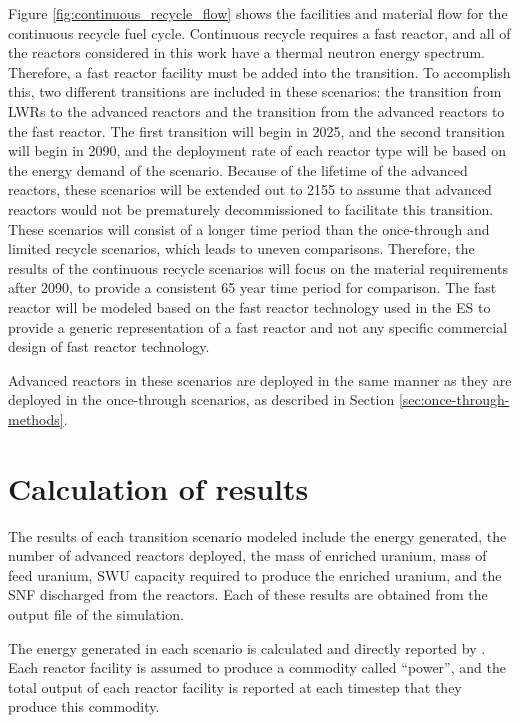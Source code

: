 Figure \ref{fig:continuous_recycle_flow} shows the facilities and material 
flow for the continuous recycle fuel cycle. Continuous recycle 
requires a fast reactor, and all of the reactors considered in this 
work have a thermal neutron energy spectrum. Therefore, a fast reactor 
facility 
must be added into the transition. To accomplish this, two different 
transitions are included in these scenarios: the transition from 
\glspl{LWR} to the advanced reactors and the transition from the 
advanced reactors to the fast reactor. The first transition will begin 
in 2025, and the second transition will begin in 2090, and the deployment 
rate of each reactor type will be based on the energy demand of the 
scenario. Because of the lifetime of the advanced reactors, these scenarios 
will be extended out to 2155 to assume that advanced reactors would not 
be prematurely decommissioned to facilitate this transition. These 
scenarios will consist of a longer time period than the once-through 
and limited recycle scenarios, which leads to uneven comparisons. Therefore, 
the results of the continuous recycle scenarios will focus on the 
material requirements after 2090, to provide a consistent 65 year 
time period for comparison. 
The fast reactor will be modeled 
based on the fast reactor technology used in the \gls{ES} 
\cite{wigeland_nuclear_2014} to provide a generic representation of 
a fast reactor and not any specific commercial design of fast reactor 
technology. 



Advanced reactors in these scenarios are deployed in the same manner 
as they are deployed in the once-through scenarios, as described in 
Section \ref{sec:once-through-methods}. 
 

\section{Calculation of results} \label{sec:results_calc}
The results of each transition scenario modeled include the energy generated, 
the number of advanced reactors deployed, the mass of enriched uranium, 
mass of feed uranium, \gls{SWU} capacity required to produce the enriched 
uranium, and the \gls{SNF} discharged from the reactors. Each of these results 
are obtained from the \Cyclus output file of the simulation. 

The energy generated in each scenario is calculated and directly 
reported by \Cyclus. Each reactor facility is assumed to produce a 
commodity called ``power'', and the total output of each reactor facility 
is reported at each timestep that they produce this commodity. 

